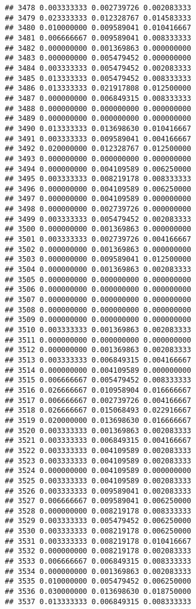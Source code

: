 \documentclass[
]{article}
\begin{document}
\begin{verbatim}
## 3478 0.003333333 0.002739726 0.002083333
## 3479 0.023333333 0.012328767 0.014583333
## 3480 0.010000000 0.009589041 0.010416667
## 3481 0.006666667 0.009589041 0.008333333
## 3482 0.000000000 0.001369863 0.000000000
## 3483 0.000000000 0.005479452 0.000000000
## 3484 0.003333333 0.005479452 0.002083333
## 3485 0.013333333 0.005479452 0.008333333
## 3486 0.013333333 0.021917808 0.012500000
## 3487 0.000000000 0.006849315 0.008333333
## 3488 0.000000000 0.000000000 0.000000000
## 3489 0.000000000 0.000000000 0.000000000
## 3490 0.013333333 0.013698630 0.010416667
## 3491 0.003333333 0.009589041 0.004166667
## 3492 0.020000000 0.012328767 0.012500000
## 3493 0.000000000 0.000000000 0.000000000
## 3494 0.000000000 0.004109589 0.006250000
## 3495 0.003333333 0.008219178 0.008333333
## 3496 0.000000000 0.004109589 0.006250000
## 3497 0.000000000 0.004109589 0.000000000
## 3498 0.000000000 0.002739726 0.000000000
## 3499 0.003333333 0.005479452 0.002083333
## 3500 0.000000000 0.001369863 0.000000000
## 3501 0.003333333 0.002739726 0.004166667
## 3502 0.000000000 0.001369863 0.000000000
## 3503 0.000000000 0.009589041 0.012500000
## 3504 0.000000000 0.001369863 0.002083333
## 3505 0.000000000 0.000000000 0.000000000
## 3506 0.000000000 0.000000000 0.000000000
## 3507 0.000000000 0.000000000 0.000000000
## 3508 0.000000000 0.000000000 0.000000000
## 3509 0.000000000 0.000000000 0.000000000
## 3510 0.003333333 0.001369863 0.002083333
## 3511 0.000000000 0.000000000 0.000000000
## 3512 0.000000000 0.001369863 0.002083333
## 3513 0.003333333 0.006849315 0.004166667
## 3514 0.000000000 0.004109589 0.000000000
## 3515 0.006666667 0.005479452 0.008333333
## 3516 0.026666667 0.010958904 0.016666667
## 3517 0.006666667 0.002739726 0.004166667
## 3518 0.026666667 0.015068493 0.022916667
## 3519 0.020000000 0.013698630 0.016666667
## 3520 0.003333333 0.001369863 0.002083333
## 3521 0.003333333 0.006849315 0.004166667
## 3522 0.003333333 0.004109589 0.002083333
## 3523 0.003333333 0.004109589 0.002083333
## 3524 0.000000000 0.004109589 0.000000000
## 3525 0.003333333 0.004109589 0.002083333
## 3526 0.003333333 0.009589041 0.002083333
## 3527 0.006666667 0.009589041 0.006250000
## 3528 0.000000000 0.008219178 0.008333333
## 3529 0.003333333 0.005479452 0.006250000
## 3530 0.003333333 0.008219178 0.006250000
## 3531 0.003333333 0.008219178 0.010416667
## 3532 0.000000000 0.008219178 0.002083333
## 3533 0.006666667 0.006849315 0.008333333
## 3534 0.000000000 0.001369863 0.002083333
## 3535 0.010000000 0.005479452 0.006250000
## 3536 0.030000000 0.013698630 0.018750000
## 3537 0.013333333 0.006849315 0.008333333

\end{verbatim}
\end{document}
